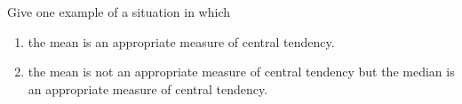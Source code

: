  Give one example of a situation in which
\begin{enumerate}
\item the mean is an appropriate measure of
central tendency.
\item the mean is not an appropriate measure
of central tendency but the median is an
appropriate measure of central tendency.
\end{enumerate}
